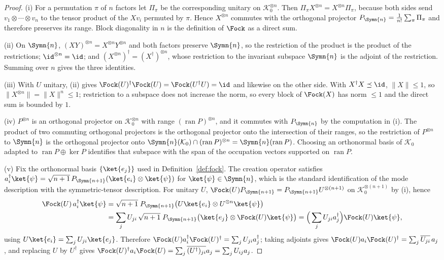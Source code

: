 \begin{proof}
(i) For a permutation $\pi$ of $n$ factors let $\Pi_\pi$ be the corresponding
unitary on $\mathcal{K}_0^{\otimes n}$. Then $\Pi_\pi X^{\otimes n}=
X^{\otimes n}\Pi_\pi$, because both sides send
$v_1\otimes\cdots\otimes v_n$ to the tensor product of the $Xv_i$ permuted by
$\pi$. Hence $X^{\otimes n}$ commutes with the orthogonal projector
$P_{\Symn{n}}=\frac{1}{n!}\sum_\pi\Pi_\pi$ and therefore preserves its range.
Block diagonality in $n$ is the definition of $\Fock$ as a direct sum.

(ii) On $\Symn{n}$, $(XY)^{\otimes n}=X^{\otimes n}Y^{\otimes n}$ and both
factors preserve $\Symn{n}$, so the restriction of the product is the product
of the restrictions; $\id^{\otimes n}=\id$; and
$(X^{\otimes n})^\dagger=(X^\dagger)^{\otimes n}$, whose restriction to the
invariant subspace $\Symn{n}$ is the adjoint of the restriction. Summing over
$n$ gives the three identities.

(iii) With $U$ unitary, (ii) gives
$\Fock(U)^\dagger\Fock(U)=\Fock(U^\dagger U)=\id$ and likewise on the other
side. With $X^\dagger X\preceq\id$, $\lVert X\rVert\le1$, so
$\lVert X^{\otimes n}\rVert=\lVert X\rVert^n\le1$; restriction to a subspace
does not increase the norm, so every block of $\Fock(X)$ has norm $\le1$ and
the direct sum is bounded by $1$.

(iv) $P^{\otimes n}$ is an orthogonal projector on $\mathcal{K}_0^{\otimes n}$
with range $(\operatorname{ran}P)^{\otimes n}$, and it commutes with
$P_{\Symn{n}}$ by the computation in (i). The product of two commuting
orthogonal projectors is the orthogonal projector onto the intersection of
their ranges, so the restriction of $P^{\otimes n}$ to $\Symn{n}$ is the
orthogonal projector onto
$\Symn{n}(\mathcal{K}_0)\cap(\operatorname{ran}P)^{\otimes n}
=\Symn{n}(\operatorname{ran}P)$. Choosing an orthonormal basis of
$\mathcal{K}_0$ adapted to $\operatorname{ran}P\oplus\ker P$ identifies that
subspace with the span of the occupation vectors supported on
$\operatorname{ran}P$.

(v) Fix the orthonormal basis $\{\ket{e_j}\}$ used in
Definition~\ref{def:fock}. The creation operator satisfies
$a_i^\dagger\ket{\psi}=\sqrt{n+1}\,P_{\Symn{n+1}}(\ket{e_i}\otimes\ket{\psi})$
for $\ket{\psi}\in\Symn{n}$, which is the standard identification of the mode
description with the symmetric-tensor description. For unitary $U$,
$\Fock(U)P_{\Symn{n+1}}=P_{\Symn{n+1}}U^{\otimes(n+1)}$ on
$\mathcal{K}_0^{\otimes(n+1)}$ by (i), hence
\begin{align}
  \Fock(U)\,a_i^\dagger\ket{\psi}
  &=\sqrt{n+1}\;P_{\Symn{n+1}}\big(U\ket{e_i}\otimes U^{\otimes n}\ket{\psi}\big)
  \nonumber\\
  &=\sum_j U_{ji}\,\sqrt{n+1}\;P_{\Symn{n+1}}
      \big(\ket{e_j}\otimes\Fock(U)\ket{\psi}\big)
  =\Big(\sum_jU_{ji}a_j^\dagger\Big)\Fock(U)\ket{\psi},
\end{align}
using $U\ket{e_i}=\sum_jU_{ji}\ket{e_j}$. Therefore
$\Fock(U)a_i^\dagger\Fock(U)^\dagger=\sum_jU_{ji}a_j^\dagger$; taking adjoints
gives $\Fock(U)a_i\Fock(U)^\dagger=\sum_j\overline{U_{ji}}\,a_j$, and
replacing $U$ by $U^\dagger$ gives
$\Fock(U)^\dagger a_i\Fock(U)=\sum_j\overline{(U^\dagger)_{ji}}a_j
=\sum_jU_{ij}a_j$.
\end{proof}
